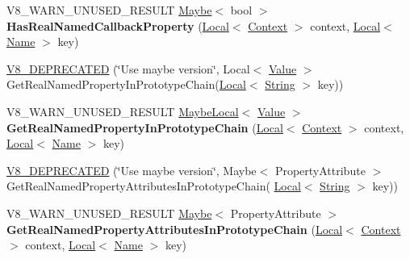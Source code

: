 \begin{DoxyCompactItemize}
\item 
V8\+\_\+\+W\+A\+R\+N\+\_\+\+U\+N\+U\+S\+E\+D\+\_\+\+R\+E\+S\+U\+LT \hyperlink{classv8_1_1_maybe}{Maybe}$<$ bool $>$ {\bfseries Has\+Real\+Named\+Callback\+Property} (\hyperlink{classv8_1_1_local}{Local}$<$ \hyperlink{classv8_1_1_context}{Context} $>$ context, \hyperlink{classv8_1_1_local}{Local}$<$ \hyperlink{classv8_1_1_name}{Name} $>$ key)\hypertarget{classv8_1_1_object_a62bde6bea1ce32b30b2152f33a105b14}{}\label{classv8_1_1_object_a62bde6bea1ce32b30b2152f33a105b14}

\item 
\hyperlink{classv8_1_1_object_a00982b58e0c86fcb37f5d74c8a33d1b8}{V8\+\_\+\+D\+E\+P\+R\+E\+C\+A\+T\+ED} (\char`\"{}Use maybe version\char`\"{}, Local$<$ \hyperlink{classv8_1_1_value}{Value} $>$ Get\+Real\+Named\+Property\+In\+Prototype\+Chain(\hyperlink{classv8_1_1_local}{Local}$<$ \hyperlink{classv8_1_1_string}{String} $>$ key))
\item 
V8\+\_\+\+W\+A\+R\+N\+\_\+\+U\+N\+U\+S\+E\+D\+\_\+\+R\+E\+S\+U\+LT \hyperlink{classv8_1_1_maybe_local}{Maybe\+Local}$<$ \hyperlink{classv8_1_1_value}{Value} $>$ {\bfseries Get\+Real\+Named\+Property\+In\+Prototype\+Chain} (\hyperlink{classv8_1_1_local}{Local}$<$ \hyperlink{classv8_1_1_context}{Context} $>$ context, \hyperlink{classv8_1_1_local}{Local}$<$ \hyperlink{classv8_1_1_name}{Name} $>$ key)\hypertarget{classv8_1_1_object_afe68d490fc41783e30126ca547b7fc90}{}\label{classv8_1_1_object_afe68d490fc41783e30126ca547b7fc90}

\item 
\hyperlink{classv8_1_1_object_ad227cb56752461c88badb0924132cfbc}{V8\+\_\+\+D\+E\+P\+R\+E\+C\+A\+T\+ED} (\char`\"{}Use maybe version\char`\"{}, Maybe$<$ Property\+Attribute $>$ Get\+Real\+Named\+Property\+Attributes\+In\+Prototype\+Chain(                               \hyperlink{classv8_1_1_local}{Local}$<$ \hyperlink{classv8_1_1_string}{String} $>$ key))
\item 
V8\+\_\+\+W\+A\+R\+N\+\_\+\+U\+N\+U\+S\+E\+D\+\_\+\+R\+E\+S\+U\+LT \hyperlink{classv8_1_1_maybe}{Maybe}$<$ Property\+Attribute $>$ {\bfseries Get\+Real\+Named\+Property\+Attributes\+In\+Prototype\+Chain} (\hyperlink{classv8_1_1_local}{Local}$<$ \hyperlink{classv8_1_1_context}{Context} $>$ context, \hyperlink{classv8_1_1_local}{Local}$<$ \hyperlink{classv8_1_1_name}{Name} $>$ key)\hypertarget{classv8_1_1_object_aab7c2e5c5659e95e97488e01b04bf3c8}{}\label{classv8_1_1_object_aab7c2e5c5659e95e97488e01b04bf3c8}


\end{DoxyCompactItemize}
